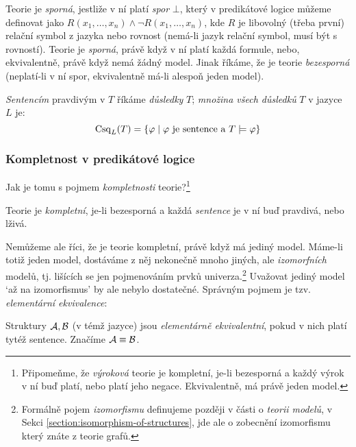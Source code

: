 Teorie je \emph{sporná}, jestliže v ní platí \emph{spor} $\bot$, který v predikátové logice můžeme definovat jako $R(x_1,\dots,x_n)\land \neg R(x_1,\dots,x_n)$, kde $R$ je libovolný (třeba první) relační symbol z jazyka nebo rovnost (nemá-li jazyk relační symbol, musí být s rovností). Teorie je \emph{sporná}, právě když v ní platí každá formule, nebo, ekvivalentně, právě když nemá žádný model. Jinak říkáme, že je teorie \emph{bezesporná} (neplatí-li v ní spor, ekvivalentně má-li alespoň jeden model).

\emph{Sentencím} pravdivým v $T$ říkáme \emph{důsledky} $T$; \emph{množina všech důsledků} $T$ v jazyce $L$ je:
$$
\operatorname{Csq}_L(T)=\{\varphi\mid\text{$\varphi$ je sentence a }T\models \varphi\}
$$

\subsubsection{Kompletnost v predikátové logice }
Jak je tomu s pojmem \emph{kompletnosti} teorie?\footnote{Připomeňme, že \emph{výroková} teorie je kompletní, je-li bezesporná a každý výrok v ní buď platí, nebo platí jeho negace. Ekvivalentně, má právě 
jeden model.}

\begin{definition}
    Teorie je \emph{kompletní}, je-li bezesporná a každá \emph{sentence} je v ní buď pravdivá, nebo lživá.
\end{definition}

Nemůžeme ale říci, že je teorie kompletní, právě když má jediný model. Máme-li totiž jeden model, dostáváme z něj nekonečně mnoho jiných, ale \emph{izomorfních} modelů, tj. lišících se jen pojmenováním prvků univerza.\footnote{Formálně pojem \emph{izomorfismu} definujeme později v části o \emph{teorii modelů}, v Sekci \ref{section:isomorphism-of-structures}, jde ale o zobecnění izomorfismu který znáte z teorie grafů.} Uvažovat jediný model `až na izomorfismus' by ale nebylo dostatečné. Správným pojmem je tzv. \emph{elementární ekvivalence}:

\begin{definition}
    Struktury $\mathcal{A},\mathcal{B}$ (v témž jazyce) jsou \emph{elementárně ekvivalentní}, pokud v nich platí tytéž sentence. Značíme $\mathcal{A}\equiv\mathcal{B}$.
\end{definition}

